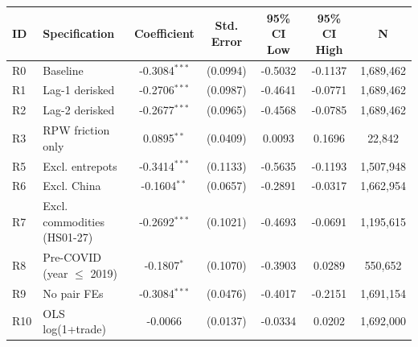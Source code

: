 \begin{tabular}{llccccc}
\toprule
ID & Specification & Coefficient & Std. Error & 95\% CI Low & 95\% CI High & N \\
\midrule
R0 & Baseline & -0.3084$^{***}$ & (0.0994) & -0.5032 & -0.1137 & 1,689,462 \\
R1 & Lag-1 derisked & -0.2706$^{***}$ & (0.0987) & -0.4641 & -0.0771 & 1,689,462 \\
R2 & Lag-2 derisked & -0.2677$^{***}$ & (0.0965) & -0.4568 & -0.0785 & 1,689,462 \\
R3 & RPW friction only & 0.0895$^{**}$ & (0.0409) & 0.0093 & 0.1696 & 22,842 \\
R5 & Excl. entrepots & -0.3414$^{***}$ & (0.1133) & -0.5635 & -0.1193 & 1,507,948 \\
R6 & Excl. China & -0.1604$^{**}$ & (0.0657) & -0.2891 & -0.0317 & 1,662,954 \\
R7 & Excl. commodities (HS01-27) & -0.2692$^{***}$ & (0.1021) & -0.4693 & -0.0691 & 1,195,615 \\
R8 & Pre-COVID (year $\leq$ 2019) & -0.1807$^{*}$ & (0.1070) & -0.3903 & 0.0289 & 550,652 \\
R9 & No pair FEs & -0.3084$^{***}$ & (0.0476) & -0.4017 & -0.2151 & 1,691,154 \\
R10 & OLS log(1+trade) & -0.0066 & (0.0137) & -0.0334 & 0.0202 & 1,692,000 \\
\bottomrule
\end{tabular}